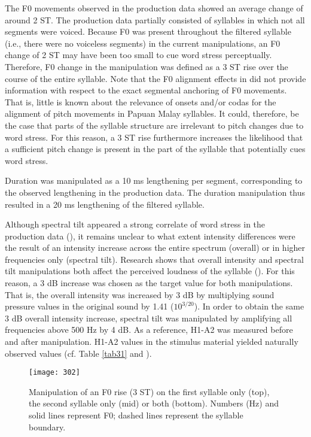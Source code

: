 The F0 movements observed in the production data showed an average change of around 2 ST. The production data partially consisted of syllables in which not all segments were voiced. Because F0 was present throughout the filtered syllable (i.e., there were no voiceless segments) in the current manipulations, an F0 change of 2 ST may have been too small to cue word stress perceptually. Therefore, F0 change in the manipulation was defined as a 3 ST rise over the course of the entire syllable. Note that the F0 alignment effects in  did not provide information with respect to the exact segmental anchoring of F0 movements. That is, little is known about the relevance of onsets and/or codas for the alignment of pitch movements in Papuan Malay syllables. It could, therefore, be the case that parts of the syllable structure are irrelevant to pitch changes due to word stress. For this reason, a 3 ST rise furthermore increases the likelihood that a sufficient pitch change is present in the part of the syllable that potentially cues word stress.

Duration was manipulated as a 10 ms lengthening per segment, corresponding to the observed lengthening in the production data. The duration manipulation thus resulted in a 20 ms lengthening of the filtered syllable.

Although spectral tilt appeared a strong correlate of word stress in the production data (), it remains unclear to what extent intensity differences were the result of an intensity increase across the entire spectrum (overall) or in higher frequencies only (spectral tilt). Research shows that overall intensity and spectral tilt manipulations both affect the perceived loudness of the syllable (\citealt{sluijter_spectral_1996}). For this reason, a 3 dB increase was chosen as the target value for both manipulations. That is, the overall intensity was increased by 3 dB by multiplying sound pressure values in the original sound by 1.41 ($10^{3/20}$). In order to obtain the same 3 dB overall intensity increase, spectral tilt was manipulated by amplifying all frequencies above 500 Hz by 4 dB. As a reference, H1-A2 was measured before and after manipulation. H1-A2 values in the stimulus material yielded naturally observed values (cf. Table \ref{tab31} and ).

\begin{figure}
\texttt{[image: 302]}
\caption{Manipulation of an F0 rise (3 ST) on the first syllable only (top), the second syllable only (mid) or both (bottom). Numbers (Hz) and solid lines represent F0; dashed lines represent the syllable boundary.}\label{fig302}
\end{figure}

